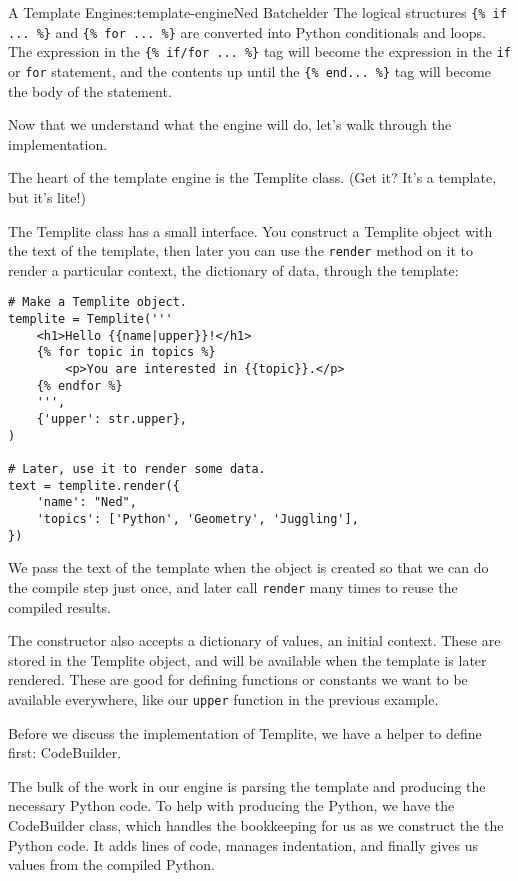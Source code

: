 \begin{aosachapter}{A Template Engine}{s:template-engine}{Ned Batchelder}
The logical structures \texttt{\{\% if ... \%\}} and
\texttt{\{\% for ... \%\}} are converted into Python conditionals and
loops. The expression in the \texttt{\{\% if/for ... \%\}} tag will
become the expression in the \texttt{if} or \texttt{for} statement, and
the contents up until the \texttt{\{\% end... \%\}} tag will become the
body of the statement.

\label{writing-the-engine}

Now that we understand what the engine will do, let's walk through the
implementation.

\label{the-templite-class}

The heart of the template engine is the Templite class. (Get it? It's a
template, but it's lite!)

The Templite class has a small interface. You construct a Templite
object with the text of the template, then later you can use the
\texttt{render} method on it to render a particular context, the
dictionary of data, through the template:

\begin{verbatim}
# Make a Templite object.
templite = Templite('''
    <h1>Hello {{name|upper}}!</h1>
    {% for topic in topics %}
        <p>You are interested in {{topic}}.</p>
    {% endfor %}
    ''',
    {'upper': str.upper},
)

# Later, use it to render some data.
text = templite.render({
    'name': "Ned",
    'topics': ['Python', 'Geometry', 'Juggling'],
})
\end{verbatim}

We pass the text of the template when the object is created so that we
can do the compile step just once, and later call \texttt{render} many
times to reuse the compiled results.

The constructor also accepts a dictionary of values, an initial context.
These are stored in the Templite object, and will be available when the
template is later rendered. These are good for defining functions or
constants we want to be available everywhere, like our \texttt{upper}
function in the previous example.

Before we discuss the implementation of Templite, we have a helper to
define first: CodeBuilder.

\label{codebuilder}

The bulk of the work in our engine is parsing the template and producing
the necessary Python code. To help with producing the Python, we have
the CodeBuilder class, which handles the bookkeeping for us as we
construct the the Python code. It adds lines of code, manages
indentation, and finally gives us values from the compiled Python.


\end{aosachapter}
